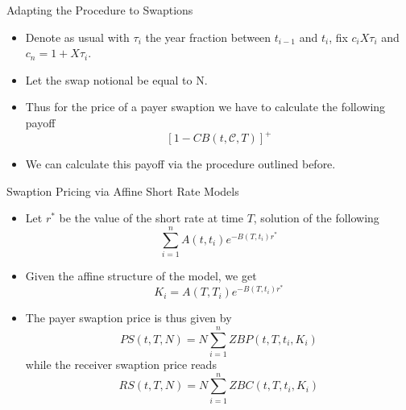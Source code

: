 \documentclass{beamer}
\begin{document}
\begin{frame}{Adapting the Procedure to Swaptions}
	\begin{itemize}
		\item Denote as usual with $\tau_i$ the year fraction between $t_{i-1}$ and $t_i$, fix $c_i X\tau_i$ and $c_n = 1+X\tau_i$.
		\item Let the swap notional be equal to N.
		\item Thus for the price of a payer swaption we have to calculate the following payoff
		\begin{equation}
			\left[1-CB(t,\mathcal{C},T)\right]^+
		\end{equation}
		\item We can calculate this payoff via the procedure outlined before.
	\end{itemize}
\end{frame}

\begin{frame}{Swaption Pricing via Affine Short Rate Models}
	\begin{itemize}
		\item Let $r^*$ be the value of the short rate at time $T$, solution of the following 
		\begin{equation}
			\sum_{i=1}^n A(t,t_i)e^{-B(T,t_i)r^*}
		\end{equation}
		\item Given the affine structure of the model, we get
		\begin{equation}
			K_i = A(T,T_i)e^{-B(T,t_i)r^*}
		\end{equation}
		\item The payer swaption price is thus given by
		\begin{equation}
			PS(t,T,N) = N\sum_{i=1}^n ZBP(t,T,t_i,K_i)
		\end{equation}
		while the receiver swaption price reads
		\begin{equation}
			RS(t,T,N) = N\sum_{i=1}^n ZBC(t,T,t_i,K_i)
		\end{equation}
	\end{itemize}
\end{frame}
\end{document}

